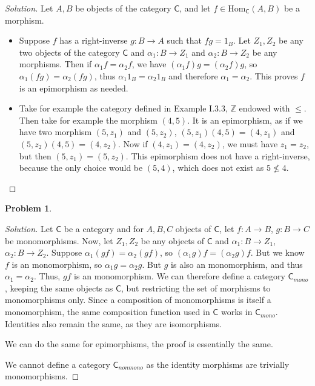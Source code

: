 \documentclass{article}
\theoremstyle{definition}
\newtheorem{problem-internal}{Problem}[subsection]
\newenvironment{problem}{
	\medskip
	\begin{problem-internal}
	}{
\end{problem-internal}
}
\newenvironment{solution}{
	\begin{proof}[Solution]
		\vspace{-8px}
		\setlength{\parskip}{4px}
		\setlength{\parindent}{0px}
	}{
\end{proof}
}
\newcommand{\Hom}{\mathrm{Hom}}
\newcommand{\C}{\mathsf{C}}
\begin{document}
\begin{solution}
	Let $A, B$ be objects of the category $\C$, and let $f \in \Hom_\C(A, B)$ be a morphism.
	\begin{itemize}
		\item Suppose $f$ has a right-inverse $g: B \to A$ such that $fg = 1_B$. Let $Z_1, Z_2$ be any two objects of the category $\C$ and $\alpha_1: B \to Z_1$ and $\alpha_2: B \to Z_2$ be any morphisms. Then if $\alpha_1 f = \alpha_2 f$, we have $(\alpha_1 f) g = (\alpha_2 f) g$, so $\alpha_1 (fg) = \alpha_2 (fg)$, thus $\alpha_1 1_B = \alpha_2 1_B$ and therefore $\alpha_1 = \alpha_2$. This proves $f$ is an epimorphism as needed.
		\item Take for example the category defined in Example I.3.3, $\mathbb{Z}$ endowed with $\leq$. Then take for example the morphism $(4,5)$. It is an epimorphism, as if we have two morphism $(5, z_1)$ and $(5, z_2)$, $(5, z_1)(4,5)=(4, z_1)$ and $(5, z_2)(4,5)=(4,z_2)$. Now if $(4,z_1)=(4,z_2)$, we must have $z_1 = z_2$, but then $(5,z_1)=(5,z_2)$. This epimorphism does not have a right-inverse, because the only choice would be $(5,4)$, which does not exist as $5 \not \leq 4$.
	\end{itemize}
\end{solution}

\begin{problem}
\end{problem}

\begin{solution}
	Let $\C$ be a category and for $A,B,C$ objects of $\C$, let $f: A \to B$, $g: B \to C$ be monomorphisms. Now, let $Z_1, Z_2$ be any objects of $\C$ and $\alpha_1: B \to Z_1$, $\alpha_2: B \to Z_2$. Suppose $\alpha_1 (gf) = \alpha_2 (gf)$, so $(\alpha_1 g)f = (\alpha_2 g)f$. But we know $f$ is an monomorphism, so $\alpha_1 g = \alpha_2 g$. But $g$ is also an monomorphism, and thus $\alpha_1 = \alpha_2$. Thus, $gf$ is an monomorphism. We can therefore define a category $\C_{mono}$, keeping the same objects as $\C$, but restricting the set of morphisms to monomorphisms only. Since a composition of monomorphisms is itself a monomorphism, the same composition function used in $\C$ works in $\C_{mono}$. Identities also remain the same, as they are isomorphisms.
	
	We can do the same for epimorphisms, the proof is essentially the same.
	
	We cannot define a category $\C_{nonmono}$ as the identity morphisms are trivially monomorphisms.
\end{solution}
\end{document}
